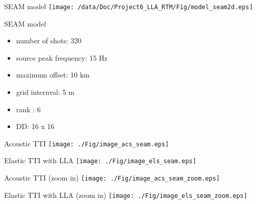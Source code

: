 \documentclass[aspectratio=169]{beamer}
\begin{document}
\begin{frame}{SEAM model}
  \texttt{[image: /data/Doc/Project6\_LLA\_RTM/Fig/model\_seam2d.eps]}
\end{frame}
\begin{frame}{SEAM model}
\begin{itemize}
\item{number of shots: 320}
\item{source peak frequency: 15 Hz}
\item{maximum offset: 10 km}
\item{grid internval: 5 m}
\item{rank : 6}
\item{DD: 16 x 16}
\end{itemize}
\end{frame}
\begin{frame}{Acoustic TTI}
\center
  \texttt{[image: ./Fig/image\_acs\_seam.eps]}
\end{frame}
\begin{frame}{Elastic TTI with LLA}
\center
  \texttt{[image: ./Fig/image\_els\_seam.eps]}
\end{frame}
\begin{frame}{Acoustic TTI (zoom in)}
\center
  \texttt{[image: ./Fig/image\_acs\_seam\_zoom.eps]}
\end{frame}
\begin{frame}{Elastic TTI with LLA (zoom in)}
\center
  \texttt{[image: ./Fig/image\_els\_seam\_zoom.eps]}
\end{frame}
\end{document}

